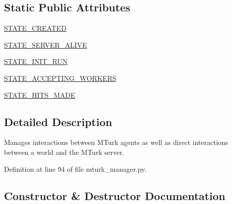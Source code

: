 \subsection*{Static Public Attributes}
\begin{DoxyCompactItemize}
\item 
\hyperlink{classparlai_1_1mturk_1_1core_1_1dev_1_1mturk__manager_1_1MTurkManager_a0f7a896e395e0201436504a28c3b2c59}{S\+T\+A\+T\+E\+\_\+\+C\+R\+E\+A\+T\+ED}
\item 
\hyperlink{classparlai_1_1mturk_1_1core_1_1dev_1_1mturk__manager_1_1MTurkManager_a3b27b3e98f420814dc7ef248839c053c}{S\+T\+A\+T\+E\+\_\+\+S\+E\+R\+V\+E\+R\+\_\+\+A\+L\+I\+VE}
\item 
\hyperlink{classparlai_1_1mturk_1_1core_1_1dev_1_1mturk__manager_1_1MTurkManager_a0e6f65be04d9a7cda6f58aa9fcbfc5f7}{S\+T\+A\+T\+E\+\_\+\+I\+N\+I\+T\+\_\+\+R\+UN}
\item 
\hyperlink{classparlai_1_1mturk_1_1core_1_1dev_1_1mturk__manager_1_1MTurkManager_ab9d7cb289b43380fa290778b41a54e55}{S\+T\+A\+T\+E\+\_\+\+A\+C\+C\+E\+P\+T\+I\+N\+G\+\_\+\+W\+O\+R\+K\+E\+RS}
\item 
\hyperlink{classparlai_1_1mturk_1_1core_1_1dev_1_1mturk__manager_1_1MTurkManager_a176ce171802f713cac46b2d5f64ba369}{S\+T\+A\+T\+E\+\_\+\+H\+I\+T\+S\+\_\+\+M\+A\+DE}
\end{DoxyCompactItemize}


\subsection{Detailed Description}
\begin{DoxyVerb}Manages interactions between MTurk agents as well as direct interactions between a
world and the MTurk server.
\end{DoxyVerb}
 

Definition at line 94 of file mturk\+\_\+manager.\+py.



\subsection{Constructor \& Destructor Documentation}
\mbox{\label{classparlai_1_1mturk_1_1core_1_1dev_1_1mturk__manager_1_1MTurkManager_add88d49ae7a5b5ee28b83267eae0ac76}} 
